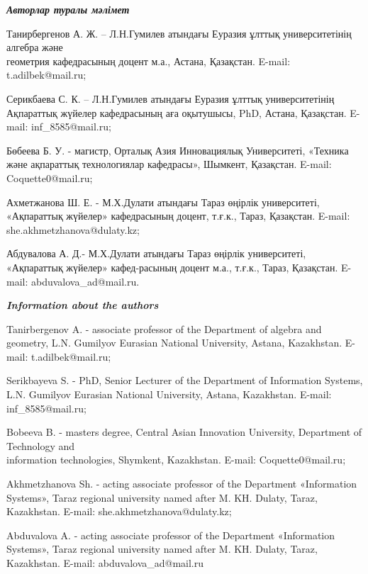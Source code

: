 \emph{{\bfseries Авторлар туралы мәлімет}}


\begin{noparindent}

Танирбергенов А. Ж. -- Л.Н.Гумилев атындағы Еуразия ұлттық
университетінің алгебра және \\геометрия кафедрасының доцент м.а., Астана,
Қазақстан. E-mail: t.adilbek@mail.ru;

Серикбаева С. К. -- Л.Н.Гумилев атындағы Еуразия ұлттық
университетінің Ақпараттық жүйелер кафедрасының аға оқытушысы, PhD,
Астана, Қазақстан. E-mail: inf\_8585@mail.ru;

Бөбеева Б. У. - магистр, Орталық Азия Инновациялық
Университеті, «Техника және ақпараттық технологиялар кафедрасы»,
Шымкент, Қазақстан. E-mail: Coquette0@mail.ru;

Ахметжанова Ш. Е. - М.Х.Дулати атындағы Тараз өңірлік
университеті, «Ақпараттық жүйелер» кафедрасының доцент, т.ғ.к., Тараз,
Қазақстан. E-mail: she.akhmetzhanova@dulaty.kz;

Абдувалова А. Д.- М.Х.Дулати атындағы Тараз өңірлік
университеті, «Ақпараттық жүйелер» кафед-расының доцент м.а., т.ғ.к.,
Тараз, Қазақстан. E-mail: abduvalova\_ad@mail.ru.

\end{noparindent}

\emph{\bfseries Information about the authors}

\begin{noparindent}
Tanirbergenov A. - associate professor of the Department of algebra
and geometry, L.N. Gumilyov Eurasian National University, Astana,
Kazakhstan. E-mail: t.adilbek@mail.ru;

Serikbayeva S. - PhD, Senior Lecturer of the Department of
Information Systems, L.N. Gumilyov Eurasian National University, Astana,
Kazakhstan. E-mail: inf\_8585@mail.ru;

Bobeeva B. - master\textquotesingle s degree, Central Asian
Innovation University, Department of Technology and \\information
technologies, Shymkent, Kazakhstan. E-mail: Coquette0@mail.ru;

Akhmetzhanova Sh. - acting associate professor of the Department
«Information Systems», Taraz regional university named after M. KH.
Dulaty, Taraz, Kazakhstan. E-mail: she.akhmetzhanova@dulaty.kz;

Abduvalova A. - acting associate professor of the Department
«Information Systems», Taraz regional university named after M. KH.
Dulaty, Taraz, Kazakhstan. E-mail: abduvalova\_ad@mail.ru
\end{noparindent}
